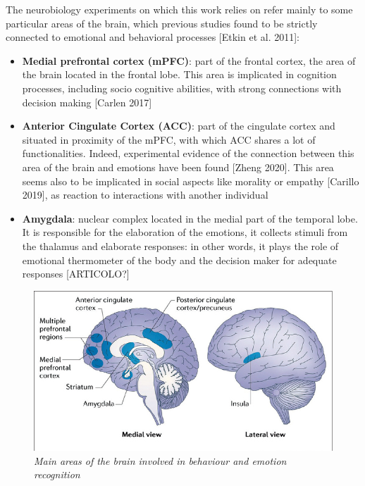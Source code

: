 \documentclass[a4paper]{article}
\begin{document}
	
	The neurobiology experiments on which this work relies on refer mainly to some particular areas of the brain, which previous studies found to be strictly connected to emotional and behavioral processes [Etkin et al. 2011]:
	\begin{itemize}
		
		\item \textbf{Medial prefrontal cortex (mPFC)}:  part of the frontal cortex, the area of the brain located in the frontal lobe. This area is implicated in cognition processes, including socio cognitive abilities,  with strong connections with decision making [Carlen 2017]
		
		\item \textbf{Anterior Cingulate Cortex (ACC)}: part of the cingulate cortex and situated in proximity of the mPFC,  with which  ACC shares a lot of functionalities. Indeed, experimental evidence of the connection between this area of the brain and emotions have been found [Zheng 2020]. This area seems also to be implicated in social aspects like morality or empathy [Carillo 2019], as reaction to interactions with another individual
		
		\item \textbf{Amygdala}: nuclear complex located in the medial part of the temporal lobe. It is responsible for the elaboration of the emotions, it collects stimuli from the thalamus and elaborate responses: in other words, it plays the role of emotional thermometer of the body and the decision maker for adequate responses [ARTICOLO?]
	\end{itemize}


	
	\begin{figure}[H]
		\begin{center}
			\includegraphics[scale=.55]{brain.png} 
		\end{center} 
		\caption{\textit{Main areas of the brain involved in behaviour and emotion recognition}}
		
	\end{figure}
\end{document}
